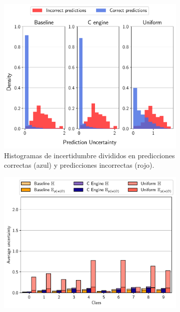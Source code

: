 

\begin{figure}[h]
     \centering
     \begin{subfigure}[b]{0.46\textwidth}
         \centering
         \includegraphics[width=\textwidth]{root/Imagenes/opt_software/hist_uncertainty.pdf}
         \caption{Histogramas de incertidumbre divididos en predicciones correctas (azul) y predicciones incorrectas (rojo).\\}
         \label{fig:bad_uncert_hist}
     \end{subfigure}
     \hfill
     \begin{subfigure}[b]{0.51\textwidth}
         \centering
         \includegraphics[width=\textwidth]{root/Imagenes/opt_software/class_uncertainty.pdf}

\end{subfigure}
\end{figure}
